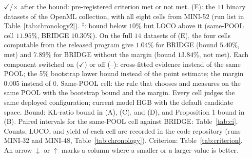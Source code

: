 \begin{table}[!t]
\vspace{2pt}
\parbox{\linewidth}{\justifying\scriptsize *$\checkmark$/$\times$ after the bound: pre-registered criterion met or not met. (E): the $11$ binary datasets of the OpenML collection, with all eight cells from MINI-52 (run list in Table~\ref{tab:chronology2}). $^{\ddagger}$: bound below $10\%$ but LOCO above it (same-POOL cell $11.95\%$, BRIDGE $10.30\%$). On the full $14$ datasets of (E), the four cells computable from the released program give $1.04\%$ for BRIDGE (bound $5.40\%$, met) and $7.89\%$ for BRIDGE without the margin (bound $13.84\%$, not met). Each component switched on ($\checkmark$) or off (--): cross-fitted evidence instead of the same POOL; the 5\% bootstrap lower bound instead of the point estimate; the margin 0.005 instead of 0. Same-POOL cell: the rule that chooses and measures on the same POOL with the bootstrap bound and the margin. Every cell judges the same deployed configuration; current model HGB with the default candidate space. Bound: KL-ratio bound in (A), (C), and (D), and Proposition 1 bound in (B). Paired intervals for the same-POOL cell against BRIDGE: Table~\ref{tab:ci}. Counts, LOCO, and yield of each cell are recorded in the code repository (runs MINI-32 and MINI-48, Table~\ref{tab:chronology}). Criterion: Table~\ref{tab:criterion}. An arrow $\downarrow$ or $\uparrow$ marks a column where a smaller or a larger value is better.}
\end{table}
